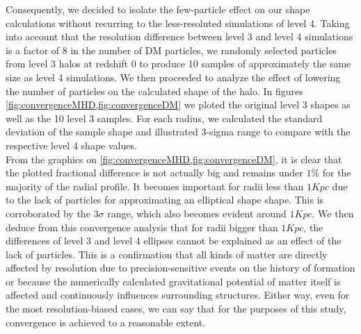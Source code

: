 Consequently, we decided to isolate the few-particle effect on our shape calculations without recurring to the less-resoluted simulations of level 4. Taking into account that the resolution difference between level 3 and level 4 simulations is a factor of 8 in the number of DM particles, we randomly selected particles from level 3 halos at redshift 0 to produce 10 samples of approximately the same size as level 4 simulations. We then proceeded to analyze the effect of lowering the number of particles on the calculated shape of the halo. In figures \ref{fig:convergenceMHD,fig:convergenceDM} we ploted the original level 3 shapes as well as the 10 level 3 samples. For each radius, we calculated the standard deviation of the sample shape and illustrated 3-sigma range to compare with the respective level 4 shape values.\\  

From the graphics on \ref{fig:convergenceMHD,fig:convergenceDM}, it is clear that the plotted fractional difference is not actually big and remains under $1\%$ for the majority of the radial profile. It becomes important for radii less than $1Kpc$ due to the lack of particles for approximating an elliptical shape shape. This is corroborated by the $3\sigma$ range, which also becomes evident around $1Kpc$. We then deduce from this convergence analysis that for radii bigger than $1Kpc$, the differences of level 3 and level 4 ellipses cannot be explained as an effect of the lack of particles. This is a confirmation that all kinds of matter are directly affected by resolution due to precision-sensitive events on the history of formation or because the numerically calculated gravitational potential of matter itself is affected and continuously influences surrounding structures. Either way, even for the most resolution-biased cases, we can say that for the purposes of this study, convergence is achieved to a reasonable extent.\\  


